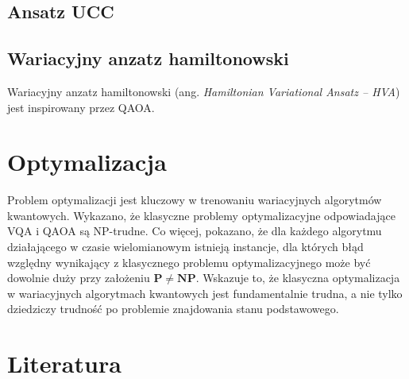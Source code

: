 \documentclass[a4paper,11pt]{article}
\newcommand{\ang}[1]{(ang. \emph{#1})}
\begin{document}
\subsection{Ansatz UCC}

\subsection{Wariacyjny anzatz hamiltonowski}

Wariacyjny anzatz hamiltonowski \ang{Hamiltonian Variational Ansatz -- HVA} jest inspirowany przez QAOA.


\newpage
\hypertarget{optymalizacja}{%
	\section{Optymalizacja}\label{optymalizacja}}


Problem optymalizacji jest kluczowy w trenowaniu wariacyjnych algorytmów kwantowych. Wykazano, że klasyczne problemy optymalizacyjne odpowiadające VQA i QAOA są NP-trudne. Co więcej, pokazano, że dla każdego algorytmu działającego w czasie wielomianowym istnieją instancje, dla których błąd względny wynikający z klasycznego problemu optymalizacyjnego może być dowolnie duży przy założeniu $\mathbf{P} \not= \mathbf{NP}$. Wskazuje to, że klasyczna optymalizacja w wariacyjnych algorytmach kwantowych jest fundamentalnie trudna, a nie tylko dziedziczy trudność po problemie znajdowania stanu podstawowego.


\newpage 



\hypertarget{literatura}{%
\section*{Literatura}\label{literatura}}
\end{document}
